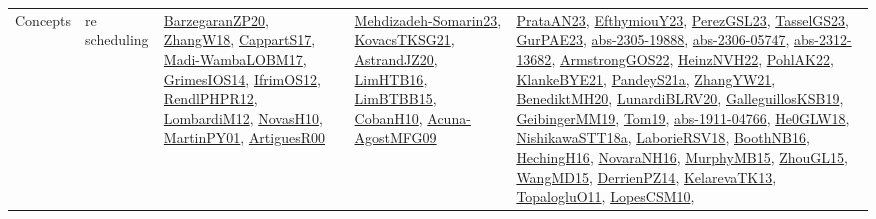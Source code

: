 {\begin{longtable}{lp{3cm}>{\raggedright}p{6cm}>{\raggedright}p{6cm}p{8cm}}
Concepts & re scheduling & \href{papers/BarzegaranZP20.pdf}{BarzegaranZP20}\cite{BarzegaranZP20}, \href{articles/ZhangW18.pdf}{ZhangW18}\cite{ZhangW18}, \href{papers/CappartS17.pdf}{CappartS17}\cite{CappartS17}, \href{papers/Madi-WambaLOBM17.pdf}{Madi-WambaLOBM17}\cite{Madi-WambaLOBM17}, \href{articles/GrimesIOS14.pdf}{GrimesIOS14}\cite{GrimesIOS14}, \href{papers/IfrimOS12.pdf}{IfrimOS12}\cite{IfrimOS12}, \href{papers/RendlPHPR12.pdf}{RendlPHPR12}\cite{RendlPHPR12}, \href{articles/LombardiM12.pdf}{LombardiM12}\cite{LombardiM12}, \href{articles/NovasH10.pdf}{NovasH10}\cite{NovasH10}, \href{articles/MartinPY01.pdf}{MartinPY01}\cite{MartinPY01}, \href{articles/ArtiguesR00.pdf}{ArtiguesR00}\cite{ArtiguesR00} & \href{papers/Mehdizadeh-Somarin23.pdf}{Mehdizadeh-Somarin23}\cite{Mehdizadeh-Somarin23}, \href{papers/KovacsTKSG21.pdf}{KovacsTKSG21}\cite{KovacsTKSG21}, \href{articles/AstrandJZ20.pdf}{AstrandJZ20}\cite{AstrandJZ20}, \href{papers/LimHTB16.pdf}{LimHTB16}\cite{LimHTB16}, \href{papers/LimBTBB15.pdf}{LimBTBB15}\cite{LimBTBB15}, \href{papers/CobanH10.pdf}{CobanH10}\cite{CobanH10}, \href{papers/Acuna-AgostMFG09.pdf}{Acuna-AgostMFG09}\cite{Acuna-AgostMFG09} & \href{articles/PrataAN23.pdf}{PrataAN23}\cite{PrataAN23}, \href{papers/EfthymiouY23.pdf}{EfthymiouY23}\cite{EfthymiouY23}, \href{papers/PerezGSL23.pdf}{PerezGSL23}\cite{PerezGSL23}, \href{papers/TasselGS23.pdf}{TasselGS23}\cite{TasselGS23}, \href{articles/GurPAE23.pdf}{GurPAE23}\cite{GurPAE23}, \href{articles/abs-2305-19888.pdf}{abs-2305-19888}\cite{abs-2305-19888}, \href{articles/abs-2306-05747.pdf}{abs-2306-05747}\cite{abs-2306-05747}, \href{articles/abs-2312-13682.pdf}{abs-2312-13682}\cite{abs-2312-13682}, \href{papers/ArmstrongGOS22.pdf}{ArmstrongGOS22}\cite{ArmstrongGOS22}, \href{articles/HeinzNVH22.pdf}{HeinzNVH22}\cite{HeinzNVH22}, \href{articles/PohlAK22.pdf}{PohlAK22}\cite{PohlAK22}, \href{papers/KlankeBYE21.pdf}{KlankeBYE21}\cite{KlankeBYE21}, \href{articles/PandeyS21a.pdf}{PandeyS21a}\cite{PandeyS21a}, \href{articles/ZhangYW21.pdf}{ZhangYW21}\cite{ZhangYW21}, \href{articles/BenediktMH20.pdf}{BenediktMH20}\cite{BenediktMH20}, \href{articles/LunardiBLRV20.pdf}{LunardiBLRV20}\cite{LunardiBLRV20}, \href{papers/GalleguillosKSB19.pdf}{GalleguillosKSB19}\cite{GalleguillosKSB19}, \href{papers/GeibingerMM19.pdf}{GeibingerMM19}\cite{GeibingerMM19}, \href{papers/Tom19.pdf}{Tom19}\cite{Tom19}, \href{articles/abs-1911-04766.pdf}{abs-1911-04766}\cite{abs-1911-04766}, \href{papers/He0GLW18.pdf}{He0GLW18}\cite{He0GLW18}, \href{papers/NishikawaSTT18a.pdf}{NishikawaSTT18a}\cite{NishikawaSTT18a}, \href{articles/LaborieRSV18.pdf}{LaborieRSV18}\cite{LaborieRSV18}, \href{papers/BoothNB16.pdf}{BoothNB16}\cite{BoothNB16}, \href{papers/HechingH16.pdf}{HechingH16}\cite{HechingH16}, \href{articles/NovaraNH16.pdf}{NovaraNH16}\cite{NovaraNH16}, \href{papers/MurphyMB15.pdf}{MurphyMB15}\cite{MurphyMB15}, \href{papers/ZhouGL15.pdf}{ZhouGL15}\cite{ZhouGL15}, \href{articles/WangMD15.pdf}{WangMD15}\cite{WangMD15}, \href{papers/DerrienPZ14.pdf}{DerrienPZ14}\cite{DerrienPZ14}, \href{papers/KelarevaTK13.pdf}{KelarevaTK13}\cite{KelarevaTK13}, \href{articles/TopalogluO11.pdf}{TopalogluO11}\cite{TopalogluO11}, \href{articles/LopesCSM10.pdf}{LopesCSM10}\cite{LopesCSM10}, 
\end{longtable}}
